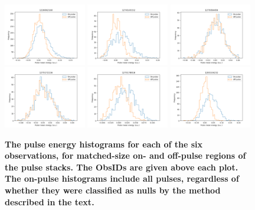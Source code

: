 \documentclass[linenumbers]{aastex631}
\begin{document}
\begin{figure}[t]
    \includegraphics[width=0.32\textwidth]{1226062160_nullhist.png}
    \includegraphics[width=0.32\textwidth]{1274143152_nullhist.png}
    \includegraphics[width=0.32\textwidth]{1275094456_nullhist.png} \\
    \includegraphics[width=0.32\textwidth]{1275172216_nullhist.png}
    \includegraphics[width=0.32\textwidth]{1275178816_nullhist.png}
    \includegraphics[width=0.32\textwidth]{1283104232_nullhist.png}
    \caption{{\bf The pulse energy histograms for each of the six observations, for matched-size on- and off-pulse regions of the pulse stacks. The ObsIDs are given above each plot. The on-pulse histograms include all pulses, regardless of whether they were classified as nulls by the method described in the text.}}
    \label{fig:nullhist}
\end{figure}
\end{document}
